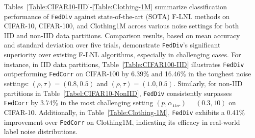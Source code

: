 \documentclass[letterpaper]{article} %
\begin{document}
Tables~\ref{Table:CIFAR10-IID}-\ref{Table:Clothing-1M} summarize classification performance of \texttt{FedDiv} against state-of-the-art (SOTA) F-LNL methods on CIFAR-10, CIFAR-100, and Clothing1M across various noise settings for both IID and non-IID data partitions. Comparison results, based on mean accuracy and standard deviation over five trials, demonstrate \texttt{FedDiv}'s significant superiority over existing F-LNL algorithms, especially in challenging cases. For instance, in IID data partitions, Table~\ref{Table:CIFAR100-IID} illustrates \texttt{FedDiv} outperforming \texttt{FedCorr} on CIFAR-100 by 6.39\% and 16.46\% in the toughest noise settings: $(\rho, \tau)=(0.8, 0.5)$ and $(\rho, \tau)=(1.0, 0.5)$. Similarly, for non-IID partitions in Table~\ref{Tabel:CIFAR10-NonIID}, \texttt{FedDiv} consistently surpasses \texttt{FedCorr} by 3.74\% in the most challenging setting $(p, \alpha_{Dir})=(0.3, 10)$ on CIFAR-10. Additionally, in Table~\ref{Table:Clothing-1M}, \texttt{FedDiv} exhibits a 0.41\% improvement over \texttt{FedCorr} on Clothing1M, indicating its efficacy in real-world label noise distributions.
\end{document}
